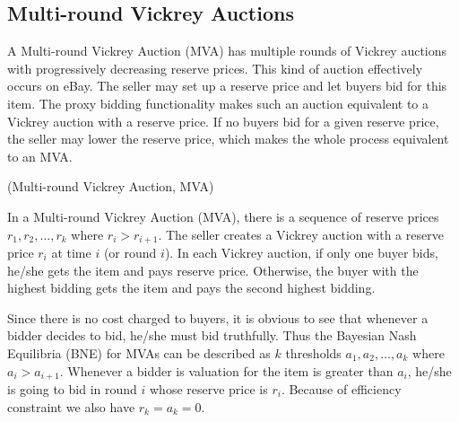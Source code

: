 \subsection{Multi-round Vickrey Auctions}

A Multi-round Vickrey Auction (MVA) has multiple rounds of Vickrey
auctions with progressively decreasing reserve prices. This kind of auction
effectively occurs on eBay. The seller may set up a reserve price and let
buyers bid for this item. The proxy bidding functionality makes such an auction
equivalent to a Vickrey auction with a reserve price. If no buyers bid for a
given reserve price, the seller may lower the reserve price, which makes the
whole process equivalent to an MVA.

\begin{definition}(Multi-round Vickrey Auction, MVA)

In a Multi-round Vickrey Auction (MVA), there is a sequence of reserve prices
$r_1, r_2, \ldots, r_k$ where $r_i > r_{i+1}$. The seller creates a Vickrey
auction with a reserve price $r_i$ at time $i$ (or round $i$). In each
Vickrey auction, if only one buyer bids, he/she gets the item and pays reserve
price. Otherwise, the buyer with the highest bidding gets the item and pays the
second highest bidding.

\end{definition}


Since there is no cost charged to buyers, it is obvious to see that whenever a
bidder decides to bid, he/she must bid truthfully. Thus the Bayesian Nash
Equilibria (BNE) for MVAs can be described as $k$ thresholds $a_1, a_2,
\ldots, a_k$ where $a_i > a_{i+1}$. Whenever a bidder is valuation for the item
is greater than $a_i$, he/she is going to bid in round $i$ whose reserve price
is $r_i$. Because of efficiency constraint we also have $r_k = a_k = 0$.

